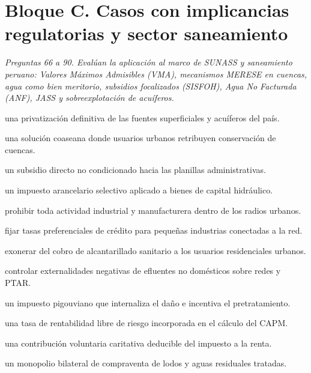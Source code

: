 \section*{Bloque C. Casos con implicancias regulatorias y sector saneamiento}

\noindent\textit{Preguntas 66 a 90. Evalúan la aplicación al marco de SUNASS y saneamiento peruano: Valores Máximos Admisibles (VMA), mecanismos MERESE en cuencas, agua como bien meritorio, subsidios focalizados (SISFOH), Agua No Facturada (ANF), JASS y sobreexplotación de acuíferos.}

\begin{opts}
    \item una privatización definitiva de las fuentes superficiales y acuíferos del país.
    \item una solución coaseana donde usuarios urbanos retribuyen conservación de cuencas.
    \item un subsidio directo no condicionado hacia las planillas administrativas.
    \item un impuesto arancelario selectivo aplicado a bienes de capital hidráulico.
\end{opts}

\begin{opts}
    \item prohibir toda actividad industrial y manufacturera dentro de los radios urbanos.
    \item fijar tasas preferenciales de crédito para pequeñas industrias conectadas a la red.
    \item exonerar del cobro de alcantarillado sanitario a los usuarios residenciales urbanos.
    \item controlar externalidades negativas de efluentes no domésticos sobre redes y PTAR.
\end{opts}

\begin{opts}
    \item un impuesto pigouviano que internaliza el daño e incentiva el pretratamiento.
    \item una tasa de rentabilidad libre de riesgo incorporada en el cálculo del CAPM.
    \item una contribución voluntaria caritativa deducible del impuesto a la renta.
    \item un monopolio bilateral de compraventa de lodos y aguas residuales tratadas.
\end{opts}

